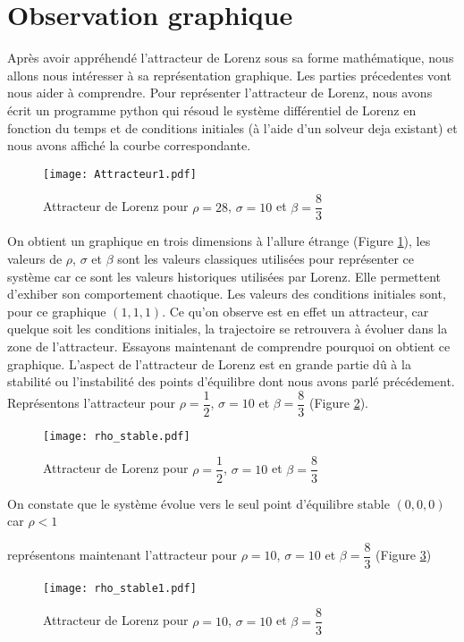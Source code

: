 \section{Observation graphique}
Après avoir appréhendé l'attracteur de Lorenz sous sa forme mathématique, nous allons nous intéresser à sa représentation graphique. Les parties précedentes vont nous aider à comprendre. Pour représenter l'attracteur de Lorenz, nous avons écrit un programme python qui résoud le système différentiel de Lorenz en fonction du temps et de conditions initiales (à l'aide d'un solveur deja existant) et nous avons affiché la courbe correspondante.

\begin{figure}[!ht]
        \centering
        \texttt{[image: Attracteur1.pdf]}
        \caption{\label{fig:attracteur1}Attracteur de Lorenz pour $\rho=28$, $\sigma=10$ et $\beta=\dfrac{8}{3}$} 
\end{figure} 

On obtient un graphique en trois dimensions à l'allure étrange (Figure \ref{fig:attracteur1}), les valeurs de $\rho$, $\sigma$ et $\beta$ sont les valeurs classiques utilisées pour représenter ce système car ce sont les valeurs historiques utilisées par Lorenz. Elle permettent d'exhiber son comportement chaotique. Les valeurs des conditions initiales sont, pour ce graphique $(1,1,1)$. Ce qu'on observe est en effet un attracteur, car quelque soit les conditions initiales, la trajectoire se retrouvera à évoluer dans la zone de l'attracteur.
Essayons maintenant de comprendre pourquoi on obtient ce graphique. L'aspect de l'attracteur de Lorenz est en grande partie dû à la stabilité ou l'instabilité des points d'équilibre dont nous avons parlé précédement. Représentons l'attracteur pour $\rho=\dfrac{1}{2}$, $\sigma=10$ et $\beta=\dfrac{8}{3}$ (Figure \ref{fig:rho_stable}).

\begin{figure}[!ht]
    \centering
    \texttt{[image: rho\_stable.pdf]}
    \caption{\label{fig:rho_stable}Attracteur de Lorenz pour $\rho=\dfrac{1}{2}$, $\sigma=10$ et $\beta=\dfrac{8}{3}$} 
\end{figure}
On constate que le système évolue vers le seul point d'équilibre stable $(0,0,0)$ car $\rho<1$

représentons maintenant l'attracteur pour $\rho=10$, $\sigma=10$ et $\beta=\dfrac{8}{3}$ (Figure \ref{fig:rho_stable1})

\begin{figure}[!ht]
    \centering
    \texttt{[image: rho\_stable1.pdf]}
    \caption{\label{fig:rho_stable1}Attracteur de Lorenz pour $\rho=10$, $\sigma=10$ et $\beta=\dfrac{8}{3}$} 
\end{figure}

